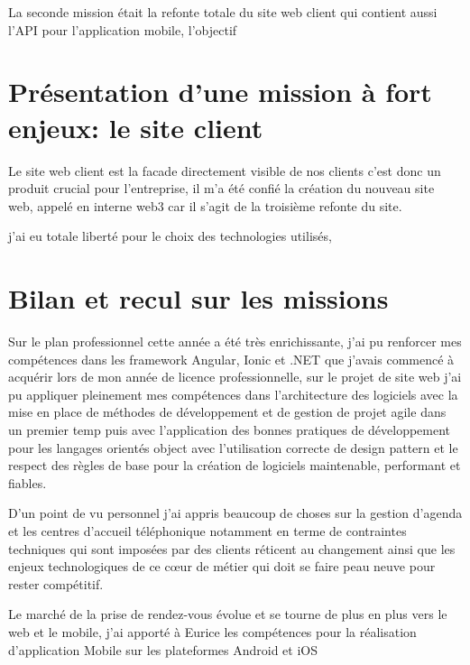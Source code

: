 La seconde mission était la refonte totale du site web client qui contient aussi l'API pour 
l'application mobile, l'objectif 

\section{Présentation d'une mission à fort enjeux: le site client}
Le site web client est la facade directement visible de nos clients c'est donc un produit crucial pour
l'entreprise, il m'a été confié la création du nouveau site web, appelé en interne web3 car il s'agit de la troisième
refonte du site.

j'ai eu totale liberté pour le choix des technologies utilisés, 


\newpage
\section{Bilan et recul sur les missions}

Sur le plan professionnel cette année a été très enrichissante, j'ai pu renforcer mes compétences dans 
les framework Angular, Ionic et .NET que j'avais commencé à acquérir lors de mon année de licence 
professionnelle, sur le projet de site web j'ai pu appliquer pleinement mes compétences 
dans l'architecture des logiciels avec la mise en place de méthodes de développement et 
de gestion de projet agile dans un premier temp puis avec l'application des bonnes pratiques 
de développement pour les langages orientés object avec l'utilisation correcte de design pattern
et le respect des règles de base pour la création de logiciels maintenable, performant et fiables.
\newline

D'un point de vu personnel j'ai appris beaucoup de choses sur la gestion d'agenda et les centres d'accueil téléphonique notamment
en terme de contraintes techniques qui sont imposées par des clients réticent au changement 
ainsi que les enjeux technologiques de ce cœur de métier qui doit se faire peau neuve 
pour rester compétitif.

Le marché de la prise de rendez-vous évolue et se tourne de plus en plus vers le 
web et le mobile, j'ai apporté à Eurice les compétences pour la réalisation d'application 
Mobile sur les plateformes Android et iOS\newline
